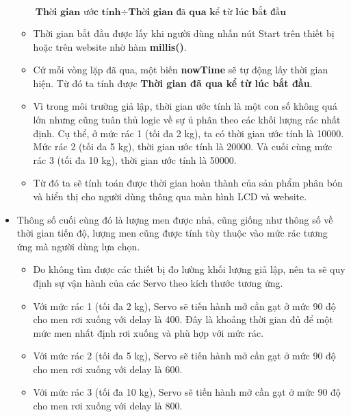 \documentclass[12pt, a4paper]{article}
\begin{document}
\begin{itemize}
\begin{itemize}
        $\textbf{Thời gian ước tính} \div \textbf{Thời gian đã qua kể từ lúc bắt đầu}$
        \item Thời gian bắt đầu được lấy khi người dùng nhấn nút Start trên thiết bị hoặc trên website nhờ hàm \textbf{millis()}.
        \item Cứ mỗi vòng lặp đã qua, một biến \textbf{nowTime} sẽ tự động lấy thời gian hiện. Từ đó ta tính được \textbf{Thời gian đã qua kể từ lúc bắt đầu}. 
        \item Vì trong môi trường giả lập, thời gian ước tính là một con số không quá lớn nhưng cũng tuân thủ logic về sự ủ phân theo các khối lượng rác nhất định. Cụ thể, ở mức rác 1 (tối đa 2 kg), ta có thời gian ước tính là 10000. Mức rác 2 (tối đa 5 kg), thời gian ước tính là 20000. Và cuối cùng mức rác 3 (tối đa 10 kg), thời gian ước tính là 50000.
        \item Từ đó ta sẽ tính toán được thời gian hoàn thành của sản phẩm phân bón và hiển thị cho người dùng thông qua màn hình LCD và website.
    \end{itemize}
    \item Thông số cuối cùng đó là lượng men được nhả, cũng giống như thông số về thời gian tiến độ, lượng men cũng được tính tùy thuộc vào mức rác tương ứng mà người dùng lựa chọn.
    \begin{itemize}
        \item Do không tìm được các thiết bị đo lường khối lượng giả lập, nên ta sẽ quy định sự vận hành của các Servo theo kích thước tương ứng.
        \item Với mức rác 1 (tối đa 2 kg), Servo sẽ tiến hành mở cần gạt ở mức 90 độ cho men rơi xuống với delay là 400. Đây là khoảng thời gian đủ để một mức men nhất định rơi xuống và phù hợp với mức rác.
        \item Với mức rác 2 (tối đa 5 kg), Servo sẽ tiến hành mở cần gạt ở mức 90 độ cho men rơi xuống với delay là 600.
        \item Với mức rác 3 (tối đa 10 kg), Servo sẽ tiến hành mở cần gạt ở mức 90 độ cho men rơi xuống với delay là 800.
    \end{itemize}
\end{itemize}
\end{document}
